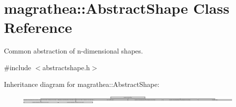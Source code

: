 \hypertarget{classmagrathea_1_1AbstractShape}{\section{magrathea\-:\-:Abstract\-Shape Class Reference}
\label{classmagrathea_1_1AbstractShape}
}


Common abstraction of n-\/dimensional shapes.  




{\ttfamily \#include $<$abstractshape.\-h$>$}

Inheritance diagram for magrathea\-:\-:Abstract\-Shape\-:\begin{figure}[H]
\begin{center}
\leavevmode
\includegraphics[height=0.435459cm]{classmagrathea_1_1AbstractShape}
\end{center}
\end{figure}
